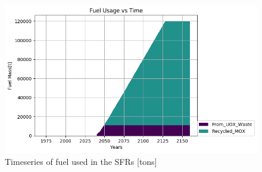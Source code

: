 \begin{figure}[htbp!]
	\begin{center}
		\includegraphics{./images/where_fuel.png}
	\end{center}
	\caption{Timeseries of fuel used in the \gls{SFR}s [tons]}
	\label{fig:fuel}
\end{figure}

\begin{table}[h]
	\centering
	\label{tab:sfr_sim_result}
	\caption {\gls{SFR} Simulation Results}
\end {table}

